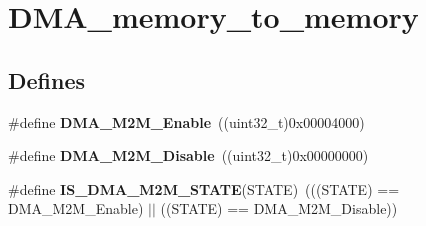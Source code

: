 \hypertarget{group__DMA__memory__to__memory}{
\section{DMA\_\-memory\_\-to\_\-memory}
\label{group__DMA__memory__to__memory}
}
\subsection*{Defines}
\begin{DoxyCompactItemize}
\item 
\hypertarget{group__DMA__memory__to__memory_ga046a1de15235c254c0511c08cae3065a}{
\#define {\bfseries DMA\_\-M2M\_\-Enable}~((uint32\_\-t)0x00004000)}
\label{group__DMA__memory__to__memory_ga046a1de15235c254c0511c08cae3065a}

\item 
\hypertarget{group__DMA__memory__to__memory_ga86e0a7076f0badd509fac6576f3b5355}{
\#define {\bfseries DMA\_\-M2M\_\-Disable}~((uint32\_\-t)0x00000000)}
\label{group__DMA__memory__to__memory_ga86e0a7076f0badd509fac6576f3b5355}

\item 
\hypertarget{group__DMA__memory__to__memory_gae0241d6265efc45f87b113cf44e50c06}{
\#define {\bfseries IS\_\-DMA\_\-M2M\_\-STATE}(STATE)~(((STATE) == DMA\_\-M2M\_\-Enable) $|$$|$ ((STATE) == DMA\_\-M2M\_\-Disable))}
\label{group__DMA__memory__to__memory_gae0241d6265efc45f87b113cf44e50c06}

\end{DoxyCompactItemize}
